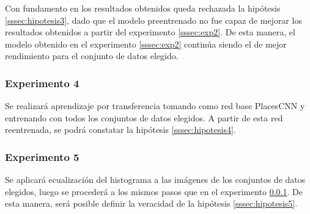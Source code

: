 Con fundamento en los resultados obtenidos queda rechazada la hipótesis \ref{sssec:hipotesis3}, dado que el modelo preentrenado no fue capaz de mejorar los resultados obtenidos a partir del experimento \ref{sssec:exp2}. De esta manera, el modelo obtenido en el experimento \ref{sssec:exp2} continúa siendo el de mejor rendimiento para el conjunto de datos elegido.

\subsubsection{Experimento 4} \label{sssec:exp4}
Se realizará aprendizaje por transferencia tomando como red base PlacesCNN y entrenando con todos los conjuntos de datos elegidos. A partir de esta red reentrenada, se podrá constatar la hipótesis \ref{sssec:hipotesis4}.

\subsubsection{Experimento 5} \label{sssec:exp5}
Se aplicará ecualización del histograma a las imágenes de los conjuntos de datos elegidos, luego se procederá a los mismos pasos que en el experimento \ref{sssec:exp4}. De esta manera, será posible definir la veracidad de la hipótesis \ref{sssec:hipotesis5}.



